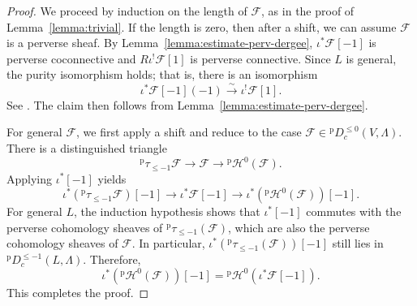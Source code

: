 \documentclass[english]{smfart}
\renewcommand{\leq}{\leqslant}
\renewcommand{\subset}{\subseteq}
\theoremstyle{remark}
\theoremstyle{plain}
\newtheorem{lemma}[remark]{Lemma}
\theoremstyle{definition}
\numberwithin{equation}{remark}
\theoremstyle{void}
\begin{document}
\begin{proof}
We proceed by induction on the length of \(\mathcal{F}\), as in the proof
of Lemma~\ref{lemma:trivial}.  If the
length is zero, then after a shift, we can assume \(\mathcal{F}\) is a
perverse sheaf.  By Lemma~\ref{lemma:estimate-perv-dergee},
\(\iota^{\ast}\mathcal{F}[-1]\) is perverse coconnective
and \(R\iota^{!}\mathcal{F}[1]\) is perverse connective.
Since \(L\) is general, the purity isomorphism holds; that is,
there is an isomorphism
\[
\iota^{\ast}\mathcal{F}[-1](-1) \xrightarrow{\sim} \iota^{!}\mathcal{F}[1].
\]
See \cite[Lemma~3.2]{wan-zhang_colevel}.  The claim then follows from
Lemma~\ref{lemma:estimate-perv-dergee}.

For general \(\mathcal{F}\), we first apply a shift and reduce to the
case \(\mathcal{F} \in {}^{\mathrm{p}}D^{\leq0}_{c}(V,\Lambda)\).
There is a distinguished triangle
\[
{}^{\mathrm{p}}\tau_{\leq-1}\mathcal{F} \to \mathcal{F}
\to {}^{\mathrm{p}}\mathcal{H}^{0}(\mathcal{F}).
\]
Applying \(\iota^{\ast}[-1]\) yields
\[
\iota^{\ast}({}^{\mathrm{p}}\tau_{\leq-1}\mathcal{F})[-1]
\to \iota^{\ast}\mathcal{F}[-1]
\to \iota^{\ast}({}^{\mathrm{p}}\mathcal{H}^{0}(\mathcal{F}))[-1].
\]
For general \(L\), the induction hypothesis shows that
\(\iota^{\ast}[-1]\) commutes with the perverse cohomology sheaves of
\({}^{\mathrm{p}}\tau_{\leq-1}(\mathcal{F})\), which are also the
perverse cohomology sheaves of \(\mathcal{F}\).  In particular,
\(\iota^{\ast}({}^{\mathrm{p}}\tau_{\leq-1}(\mathcal{F}))[-1]\) still
lies in \({}^{\mathrm{p}}D^{\leq-1}_{c}(L,\Lambda)\).  Therefore,
\[
\iota^{\ast}({}^{\mathrm{p}}\mathcal{H}^{0}(\mathcal{F}))[-1] =
{}^{\mathrm{p}}\mathcal{H}^{0}(\iota^{\ast}\mathcal{F}[-1]).
\]
This completes the proof.
\end{proof}


\end{document}
